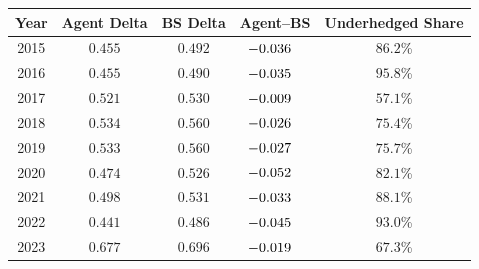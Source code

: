 \begingroup
\renewcommand{\arraystretch}{1.16}
\setlength{\tabcolsep}{7pt}
\begin{tabular}{@{}ccccc@{}}
\toprule
Year & Agent Delta & BS Delta & Agent--BS & Underhedged Share \\
\midrule
2015 & $0.455$ & $0.492$ & $\mathllap{-}0.036$ & $86.2$\% \\
2016 & $0.455$ & $0.490$ & $\mathllap{-}0.035$ & $95.8$\% \\
2017 & $0.521$ & $0.530$ & $\mathllap{-}0.009$ & $57.1$\% \\
2018 & $0.534$ & $0.560$ & $\mathllap{-}0.026$ & $75.4$\% \\
2019 & $0.533$ & $0.560$ & $\mathllap{-}0.027$ & $75.7$\% \\
2020 & $0.474$ & $0.526$ & $\mathllap{-}0.052$ & $82.1$\% \\
2021 & $0.498$ & $0.531$ & $\mathllap{-}0.033$ & $88.1$\% \\
2022 & $0.441$ & $0.486$ & $\mathllap{-}0.045$ & $93.0$\% \\
2023 & $0.677$ & $0.696$ & $\mathllap{-}0.019$ & $67.3$\% \\
\bottomrule
\end{tabular}
\endgroup
